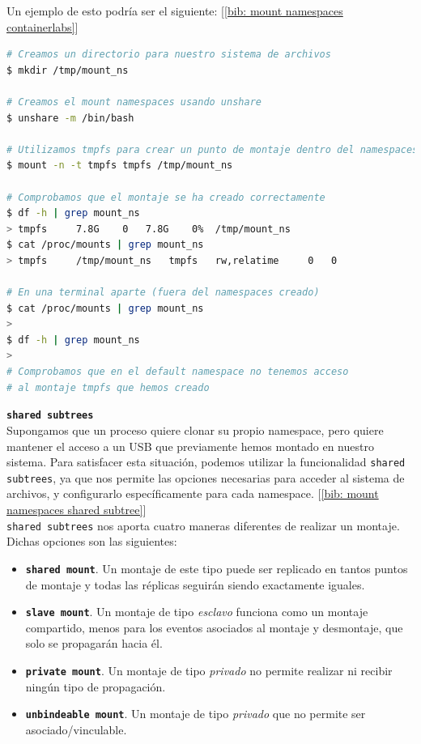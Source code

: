 \documentclass[12pt]{article}
\begin{document}
	\noindent Un ejemplo de esto podría ser el siguiente: [\ref{bib: mount namespaces containerlabs}]
	\begin{lstlisting}[language=bash, caption={Uso de \texttt{mount namespaces} con ``tmpfs''}]
# Creamos un directorio para nuestro sistema de archivos
$ mkdir /tmp/mount_ns

# Creamos el mount namespaces usando unshare
$ unshare -m /bin/bash

# Utilizamos tmpfs para crear un punto de montaje dentro del namespaces
$ mount -n -t tmpfs tmpfs /tmp/mount_ns

# Comprobamos que el montaje se ha creado correctamente
$ df -h | grep mount_ns
> tmpfs		7.8G	0	7.8G	0%	/tmp/mount_ns
$ cat /proc/mounts | grep mount_ns
> tmpfs		/tmp/mount_ns	tmpfs	rw,relatime		0	0

# En una terminal aparte (fuera del namespaces creado)
$ cat /proc/mounts | grep mount_ns
>
$ df -h | grep mount_ns
>
# Comprobamos que en el default namespace no tenemos acceso 
# al montaje tmpfs que hemos creado
	\end{lstlisting}
	
	\pagebreak
	
	\noindent \textbf{\large \texttt{shared subtrees}}\\
	
	\noindent Supongamos que un proceso quiere clonar su propio namespace, pero quiere mantener el acceso a un USB que previamente hemos montado en nuestro sistema. Para satisfacer esta situación, podemos utilizar la funcionalidad \texttt{shared subtrees}, ya que nos permite las opciones necesarias para acceder al sistema de archivos, y configurarlo específicamente para cada namespace. [\ref{bib: mount namespaces shared subtree}] \\
	
	\noindent \texttt{shared subtrees} nos aporta cuatro maneras diferentes de realizar un montaje. Dichas opciones son las siguientes:
	\begin{itemize}
		\item \textbf{\texttt{shared mount}}. Un montaje de este tipo puede ser replicado en tantos puntos de montaje y todas las réplicas seguirán siendo exactamente iguales.
		\item \textbf{\texttt{slave mount}}. Un montaje de tipo \textit{esclavo} funciona como un montaje compartido, menos para los eventos asociados al montaje y desmontaje, que solo se propagarán hacia él.
		\item \textbf{\texttt{private mount}}. Un montaje de tipo \textit{privado} no permite realizar ni recibir ningún tipo de propagación.
		\item \textbf{\texttt{unbindeable mount}}. Un montaje de tipo \textit{privado} que no permite ser asociado/vinculable.
	\end{itemize}
\end{document}
